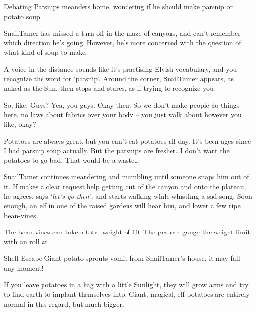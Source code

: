 \begin{multicols}{2}


{Debating Parsnips}%
{ meanders home, wondering if he should make parsnip or potato soup}%

\Gls{SnailTamer} has missed a turn-off in the maze of canyons, and can't remember which direction he's going.
However, he's more concerned with the question of what kind of soup to make.

\begin{boxtext}
A voice in the distance sounds like it's practising Elvish vocabulary, and you recognize the word for `parsnip'.
Around the corner, \gls{SnailTamer} appears, as naked as the Sun, then stops and stares, as if trying to recognize you.
\end{boxtext}

\begin{speechtext}
  So, like.  Guys?  Yea, you guys.  Okay then.  So we don't make people do things here, no laws about fabrics over your body -- you just walk about however you like, okay?

  Potatoes are always great, but you can't eat potatoes all day.
  It's been ages since I had parsnip soup actually.
  But the parsnips are fresher\ldots I don't want the potatoes to go bad.
  That would be a waste\ldots
\end{speechtext}

\Gls{SnailTamer} continues meandering and mumbling until someone snaps him out of it.
If  makes a clear request help getting out of the canyon and onto the plateau, he agrees, says `\textit{let's go then}', and starts walking while whistling a sad song.
Soon enough, an elf in one of the raised gardens will hear him, and lower a few ripe bean-vines.

The bean-vines can take a total \gls{weight} of 10.
The \glspl{pc} can gauge the weight limit with an  roll at \tn[8].

{Shell Escape}%
{Giant potato sprouts vomit from \gls{SnailTamer}'s house, it may fall any moment!}%

If you leave potatoes in a bag with a little Sunlight, they will grow arms and try to find earth to implant themselves into.
Giant, magical, elf-potatoes are entirely normal in this regard, but much bigger.


\end{multicols}
